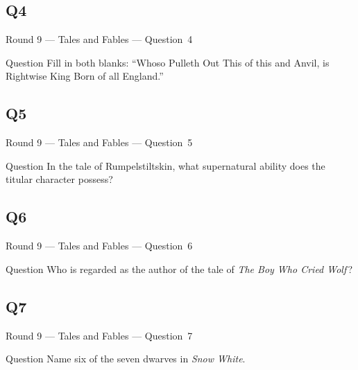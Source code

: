 \documentclass[11pt]{beamer}
\begin{document}
\subsection*{Q4}
\begin{frame}[t]{Round 9 --- Tales and Fables --- \mbox{Question 4}}
\vspace{-0.5em}
\begin{block}{Question}
Fill in both blanks: ``Whoso Pulleth Out This \textunderscore{}\textunderscore{}\textunderscore{}\textunderscore{}\textunderscore{} of this \textunderscore{}\textunderscore{}\textunderscore{}\textunderscore{}\textunderscore{} and Anvil, is Rightwise King Born of all England.''
\end{block}
\end{frame}
\subsection*{Q5}
\begin{frame}[t]{Round 9 --- Tales and Fables --- \mbox{Question 5}}
\vspace{-0.5em}
\begin{block}{Question}
In the tale of Rumpelstiltskin, what supernatural ability does the titular character possess?
\end{block}
\end{frame}
\subsection*{Q6}
\begin{frame}[t]{Round 9 --- Tales and Fables --- \mbox{Question 6}}
\vspace{-0.5em}
\begin{block}{Question}
Who is regarded as the author of the tale of \emph{The Boy Who Cried Wolf}\,?
\end{block}
\end{frame}
\subsection*{Q7}
\begin{frame}[t]{Round 9 --- Tales and Fables --- \mbox{Question 7}}
\vspace{-0.5em}
\begin{block}{Question}
Name six of the seven dwarves in \emph{Snow White}.
\end{block}
\end{frame}
\end{document}
